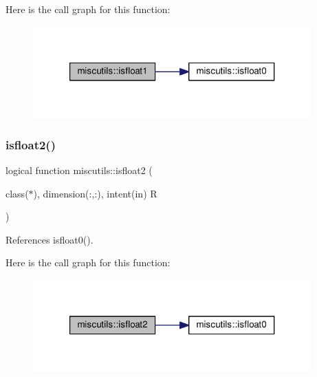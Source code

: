 Here is the call graph for this function\+:
\nopagebreak
\begin{figure}[H]
\begin{center}
\leavevmode
\includegraphics[width=304pt]{namespacemiscutils_af3d292afdf769b0ef58f6cf1f6f0145d_cgraph}
\end{center}
\end{figure}
\mbox{\label{namespacemiscutils_a64a47fd498b8846f96562efdd041adf4}} 
\subsubsection{\texorpdfstring{isfloat2()}{isfloat2()}}
{\footnotesize\ttfamily logical function miscutils\+::isfloat2 (\begin{DoxyParamCaption}\item[{class($\ast$), dimension(\+:,\+:), intent(in)}]{R }\end{DoxyParamCaption})}



References isfloat0().

Here is the call graph for this function\+:
\nopagebreak
\begin{figure}[H]
\begin{center}
\leavevmode
\includegraphics[width=304pt]{namespacemiscutils_a64a47fd498b8846f96562efdd041adf4_cgraph}
\end{center}
\end{figure}
\mbox{\label{namespacemiscutils_a218614e15a9b43ad29ae8c404825916f}} 
